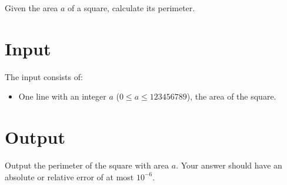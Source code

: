 \problemname{\problemyamlname} %


\newcommand{\maxa}{123456789}

Given the area $a$ of a square, calculate its perimeter.

\section*{Input}

The input consists of:
\begin{itemize}
    \item One line with an integer $a$ ($0\leq a\leq \maxa$), the area of the square.
\end{itemize}

\section*{Output}

Output the perimeter of the square with area $a$.
Your answer should have an absolute or relative error of at most $10^{-6}$.
